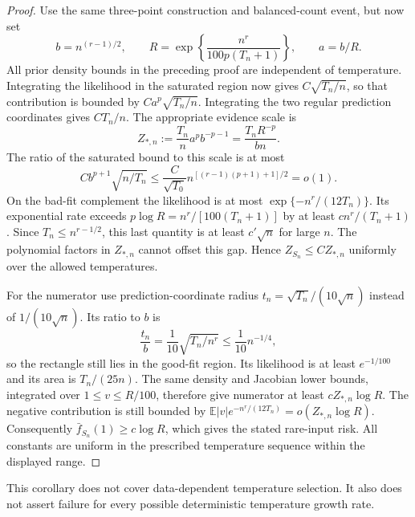 \begin{proof}
Use the same three-point construction and balanced-count event, but
now set
\[
 b=n^{(r-1)/2},\qquad
 R=\exp\left\{\frac{n^r}{100p(T_n+1)}\right\},\qquad a=b/R.
\]
All prior density bounds in the preceding proof are independent of
temperature. Integrating the likelihood in the saturated region
now gives $C\sqrt{T_n/n}$, so that contribution is bounded by
$C a^p\sqrt{T_n/n}$. Integrating the two regular prediction
coordinates gives $CT_n/n$. The appropriate evidence scale is
\[
 Z_{*,n}:=\frac{T_n}{n}a^p b^{-p-1}
        =\frac{T_nR^{-p}}{bn}.
\]
The ratio of the saturated bound to this scale is at most
\[
 C b^{p+1}\sqrt{n/T_n}
 \le\frac C{\sqrt{T_0}}
       n^{[(r-1)(p+1)+1]/2}=o(1).
\]
On the bad-fit complement the likelihood is at most
$\exp\{-n^r/(12T_n)\}$.
Its exponential rate exceeds $p\log R=n^r/[100(T_n+1)]$ by
at least $c n^r/(T_n+1)$. Since $T_n\le n^{r-1/2}$, this last
quantity is at least $c'\sqrt n$ for large $n$. The polynomial
factors in $Z_{*,n}$ cannot offset this gap. Hence
$Z_{S_n}\le C Z_{*,n}$ uniformly over the allowed temperatures.

For the numerator use prediction-coordinate radius
$t_n=\sqrt{T_n}/(10\sqrt n)$ instead of $1/(10\sqrt n)$.
Its ratio to $b$ is
\[
 \frac{t_n}b=\frac1{10}\sqrt{T_n/n^r}
                 \le\frac1{10}n^{-1/4},
\]
so the rectangle still lies in the good-fit region. Its likelihood
is at least $e^{-1/100}$ and its area is $T_n/(25n)$.
The same density and Jacobian lower bounds, integrated over
$1\le v\le R/100$, therefore give numerator at least
$c Z_{*,n}\log R$. The negative contribution is still bounded by
$\mathbb E|v|e^{-n^r/(12T_n)}=o(Z_{*,n}\log R)$.
Consequently $\bar f_{S_n}(1)\ge c\log R$, which gives the stated
rare-input risk. All constants are uniform in the prescribed
temperature sequence within the displayed range.
\end{proof}

This corollary does not cover data-dependent temperature selection.
It also does not assert failure for every possible deterministic
temperature growth rate.
